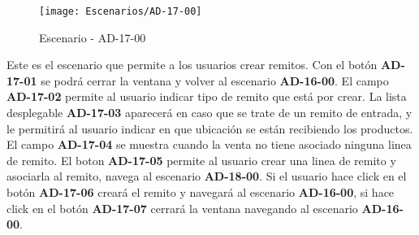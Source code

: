 \begin{figure}[H]
\centering
\texttt{[image: Escenarios/AD-17-00]}
\caption{Escenario - AD-17-00}
\label{fig:AD-17-00}
\end{figure}
Este es el escenario que permite a los usuarios crear remitos. Con el botón \textbf{AD-17-01} se podrá cerrar la ventana y volver al escenario \textbf{AD-16-00}.
El campo \textbf{AD-17-02} permite al usuario indicar tipo de remito que está por crear.  La lista desplegable \textbf{AD-17-03} aparecerá en caso que se trate de un remito de entrada, y le permitirá al usuario indicar en que ubicación se están recibiendo los productos.
El campo \textbf{AD-17-04} se muestra cuando la venta no tiene asociado ninguna linea de remito. El boton \textbf{AD-17-05} permite al usuario crear una linea de remito y asociarla al remito, navega al escenario \textbf{AD-18-00}. Si el usuario hace click en el botón \textbf{AD-17-06} creará el remito y navegará al escenario \textbf{AD-16-00}, si hace click en el botón \textbf{AD-17-07} cerrará la ventana navegando al escenario \textbf{AD-16-00}.
\clearpage
